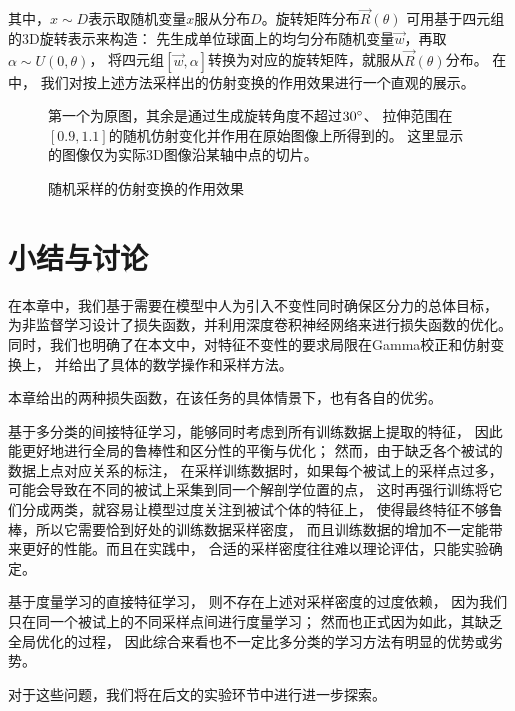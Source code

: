 其中，$x\sim D$表示取随机变量$x$服从分布$D$。旋转矩阵分布$\vec{R}(\theta)$
可用基于四元组的3D旋转表示\cite{kuipers1999quaternions}来构造：
先生成单位球面上的均匀分布随机变量$\vec{w}$，再取$\alpha \sim U(0, \theta)$，
将四元组$[\vec{w}, \alpha]$转换为对应的旋转矩阵，就服从$\vec{R}(\theta)$分布。
在中，
我们对按上述方法采样出的仿射变换的作用效果进行一个直观的展示。

\begin{figure}[H]
    {
        \caption{随机采样的仿射变换的作用效果}
        \label{fig:cnn:aug:affine}
    }
    \footnotesize
    第一个为原图，其余是通过生成旋转角度不超过$30\degree$、
    拉伸范围在$[0.9, 1.1]$的随机仿射变化并作用在原始图像上所得到的。
    这里显示的图像仅为实际3D图像沿某轴中点的切片。
\end{figure}


\section{小结与讨论\label{sec:cnn:discuss}}
在本章中，我们基于需要在模型中人为引入不变性同时确保区分力的总体目标，
为非监督学习设计了损失函数，并利用深度卷积神经网络来进行损失函数的优化。
同时，我们也明确了在本文中，对特征不变性的要求局限在Gamma校正和仿射变换上，
并给出了具体的数学操作和采样方法。

本章给出的两种损失函数，在该任务的具体情景下，也有各自的优劣。

基于多分类的间接特征学习，能够同时考虑到所有训练数据上提取的特征，
因此能更好地进行全局的鲁棒性和区分性的平衡与优化；
然而，由于缺乏各个被试的数据上点对应关系的标注，
在采样训练数据时，如果每个被试上的采样点过多，
可能会导致在不同的被试上采集到同一个解剖学位置的点，
这时再强行训练将它们分成两类，就容易让模型过度关注到被试个体的特征上，
使得最终特征不够鲁棒，所以它需要恰到好处的训练数据采样密度，
而且训练数据的增加不一定能带来更好的性能。而且在实践中，
合适的采样密度往往难以理论评估，只能实验确定。

基于度量学习的直接特征学习，
则不存在上述对采样密度的过度依赖，
因为我们只在同一个被试上的不同采样点间进行度量学习；
然而也正式因为如此，其缺乏全局优化的过程，
因此综合来看也不一定比多分类的学习方法有明显的优势或劣势。

对于这些问题，我们将在后文的实验环节中进行进一步探索。


